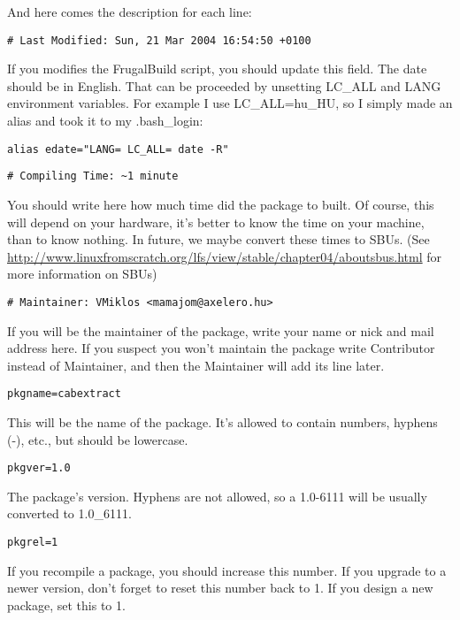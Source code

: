 And here comes the description for each line:
\begin{verbatim}
# Last Modified: Sun, 21 Mar 2004 16:54:50 +0100
\end{verbatim}

If you modifies the FrugalBuild script, you should update this field. The date should be in English. That can be proceeded by unsetting LC\_ALL and LANG environment variables. For example I use LC\_ALL=hu\_HU, so I simply made an alias and took it to my .bash\_login:
\begin{verbatim}
alias edate="LANG= LC_ALL= date -R"
\end{verbatim}
\begin{verbatim}
# Compiling Time: ~1 minute
\end{verbatim}

You should write here how much time did the package to built. Of course, this will depend on your hardware, it's better to know the time on your machine, than to know nothing. In future, we maybe convert these times to SBUs. (See \url{http://www.linuxfromscratch.org/lfs/view/stable/chapter04/aboutsbus.html} for more information on SBUs)

\begin{verbatim}
# Maintainer: VMiklos <mamajom@axelero.hu>
\end{verbatim}

If you will be the maintainer of the package, write your name or nick and mail address here. If you suspect you won't maintain the package write Contributor instead of Maintainer, and then the Maintainer will add its line later.

\begin{verbatim}
pkgname=cabextract
\end{verbatim}

This will be the name of the package. It's allowed to contain numbers, hyphens (-), etc., but should be lowercase.

\begin{verbatim}
pkgver=1.0
\end{verbatim}

The package's version. Hyphens are not allowed, so a 1.0-6111 will be usually converted to 1.0\_6111.

\begin{verbatim}
pkgrel=1
\end{verbatim}

If you recompile a package, you should increase this number. If you upgrade to a newer version, don't forget to reset this number back to 1. If you design a new package, set this to 1.

